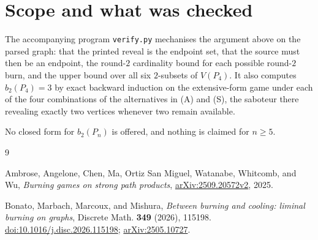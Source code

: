 \documentclass[11pt]{amsart}
\theoremstyle{remark}
\begin{document}
\section{Scope and what was checked}

The accompanying program \verb|verify.py| mechanises the argument above on the
parsed graph: that the printed reveal is the endpoint set, that the source must
then be an endpoint, the round-$2$ cardinality bound for each possible
round-$2$ burn, and the upper bound over all six $2$-subsets of $V(P_4)$. It
also computes $b_2(P_4)=3$ by exact backward induction on the extensive-form
game under each of the four combinations of the alternatives in (A) and (S),
the saboteur there revealing exactly two vertices whenever two remain
available.

No closed form for $b_2(P_n)$ is offered, and nothing is claimed for $n\ge5$.

\begin{thebibliography}{9}

Ambrose, Angelone, Chen, Ma, Ortiz San Miguel, Watanabe, Whitcomb, and Wu,
\emph{Burning games on strong path products},
\href{https://arxiv.org/abs/2509.20572v2}{arXiv:2509.20572v2}, 2025.

Bonato, Marbach, Marcoux, and Mishura,
\emph{Between burning and cooling: liminal burning on graphs},
Discrete Math. \textbf{349} (2026), 115198.
\href{https://doi.org/10.1016/j.disc.2026.115198}{doi:10.1016/j.disc.2026.115198};
\href{https://arxiv.org/abs/2505.10727}{arXiv:2505.10727}.

\end{thebibliography}
\end{document}
